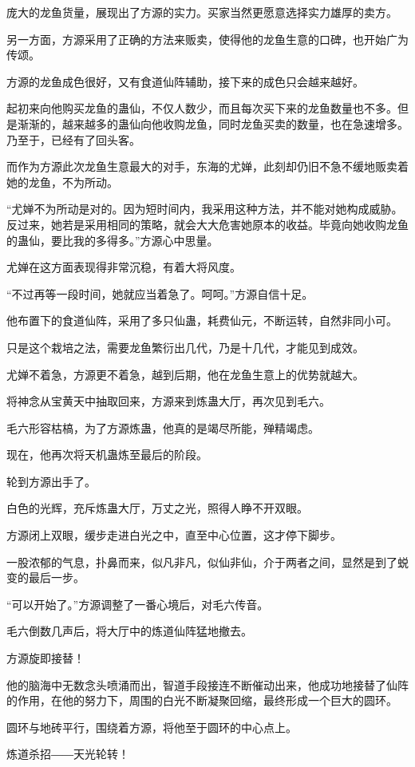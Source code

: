 \begin{this_body}
庞大的龙鱼货量，展现出了方源的实力。买家当然更愿意选择实力雄厚的卖方。

另一方面，方源采用了正确的方法来贩卖，使得他的龙鱼生意的口碑，也开始广为传颂。

方源的龙鱼成色很好，又有食道仙阵辅助，接下来的成色只会越来越好。

起初来向他购买龙鱼的蛊仙，不仅人数少，而且每次买下来的龙鱼数量也不多。但是渐渐的，越来越多的蛊仙向他收购龙鱼，同时龙鱼买卖的数量，也在急速增多。乃至于，已经有了回头客。

而作为方源此次龙鱼生意最大的对手，东海的尤婵，此刻却仍旧不急不缓地贩卖着她的龙鱼，不为所动。

“尤婵不为所动是对的。因为短时间内，我采用这种方法，并不能对她构成威胁。反过来，她若是采用相同的策略，就会大大危害她原本的收益。毕竟向她收购龙鱼的蛊仙，要比我的多得多。”方源心中思量。

尤婵在这方面表现得非常沉稳，有着大将风度。

“不过再等一段时间，她就应当着急了。呵呵。”方源自信十足。

他布置下的食道仙阵，采用了多只仙蛊，耗费仙元，不断运转，自然非同小可。

只是这个栽培之法，需要龙鱼繁衍出几代，乃是十几代，才能见到成效。

尤婵不着急，方源更不着急，越到后期，他在龙鱼生意上的优势就越大。

将神念从宝黄天中抽取回来，方源来到炼蛊大厅，再次见到毛六。

毛六形容枯槁，为了方源炼蛊，他真的是竭尽所能，殚精竭虑。

现在，他再次将天机蛊炼至最后的阶段。

轮到方源出手了。

白色的光辉，充斥炼蛊大厅，万丈之光，照得人睁不开双眼。

方源闭上双眼，缓步走进白光之中，直至中心位置，这才停下脚步。

一股浓郁的气息，扑鼻而来，似凡非凡，似仙非仙，介于两者之间，显然是到了蜕变的最后一步。

“可以开始了。”方源调整了一番心境后，对毛六传音。

毛六倒数几声后，将大厅中的炼道仙阵猛地撤去。

方源旋即接替！

他的脑海中无数念头喷涌而出，智道手段接连不断催动出来，他成功地接替了仙阵的作用，在他的努力下，周围的白光不断凝聚回缩，最终形成一个巨大的圆环。

圆环与地砖平行，围绕着方源，将他至于圆环的中心点上。

炼道杀招――天光轮转！


\end{this_body}
